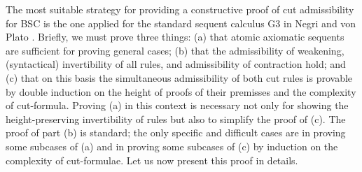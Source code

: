 \documentclass[11pt,a4paper,titlepage]{article}
\theoremstyle{definition}
\newcommand{\3}{\vspace{.3in}}
\newcommand{\2}{\vspace{.2in}}
\newcommand{\1}{\vspace{.1in}}
\newcommand{\5}{\vspace{.05in}}
\begin{document}
The most suitable strategy for providing a constructive proof of cut admissibility for BSC is the one applied for the standard sequent calculus G3 in Negri and von Plato \cite{neg:str01}. Briefly, we must prove three things: (a) that atomic axiomatic sequents are sufficient for proving general cases; (b) that the admissibility of weakening, (syntactical) invertibility of all rules, and admissibility of contraction hold; and (c) that on this basis the simultaneous admissibility of both cut rules is provable by double induction on the height of proofs of their premisses and the complexity of cut-formula. Proving (a) in this context is necessary not only for showing the height-preserving invertibility of rules but also to simplify the proof of (c). 
The proof of part (b) is standard; the only specific and difficult cases are in proving some subcases of (a) and in proving some subcases of (c) by induction on the complexity of cut-formulae. Let us now present this proof in details.
\end{document}
